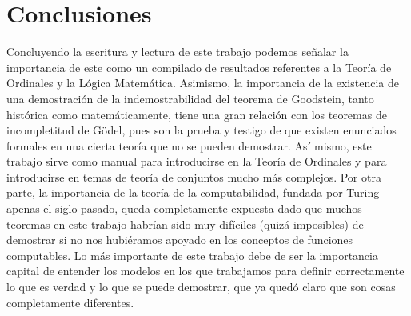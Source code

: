 \documentclass[12pt,a4paper]{book}
\numberwithin{thm}{chapter}
\theoremstyle{definition}
\begin{document}
\chapter*{Conclusiones}
Concluyendo la escritura y lectura de este trabajo podemos señalar la importancia de este como un compilado de resultados referentes a la Teoría de Ordinales y la Lógica Matemática. Asimismo, la importancia de la existencia de una demostración de la indemostrabilidad del teorema de Goodstein, tanto histórica como matemáticamente, tiene una gran relación con los teoremas de incompletitud de Gödel, pues son la prueba y testigo de que existen enunciados formales en una cierta teoría que no se pueden demostrar.
Así mismo, este trabajo sirve como manual para introducirse en la Teoría de Ordinales y para introducirse en temas de teoría de conjuntos mucho más complejos. Por otra parte, la importancia de la teoría de la computabilidad, fundada por Turing apenas el siglo pasado, queda completamente expuesta dado que muchos teoremas en este trabajo habrían sido muy difíciles (quizá imposibles) de demostrar si no nos hubiéramos apoyado en los conceptos de funciones computables.
Lo más importante de este trabajo debe de ser la importancia capital de entender los modelos en los que trabajamos para definir correctamente lo que es verdad y lo que se puede demostrar, que ya quedó claro que son cosas completamente diferentes.

\medskip



\end{document}
